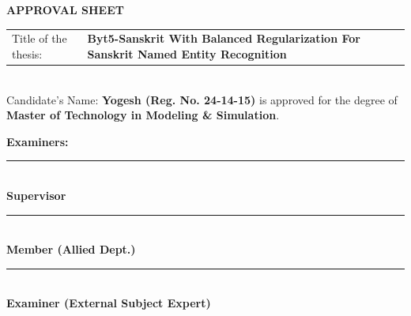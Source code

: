 \begin{center}
	{\Large \textbf{APPROVAL SHEET}}
\end{center}

\vspace{0.5em}
\vspace{1cm}
\noindent

\begin{tabular}{@{}p{4cm} p{10cm}@{}}
	{Title of the thesis:} & \setstretch{1.32}\textbf{Byt5-Sanskrit With Balanced Regularization For Sanskrit Named Entity Recognition}
\end{tabular}\\[.5em]
\indent Candidate's Name:    \textbf{Yogesh (Reg. No. 24-14-15)} is approved for the degree \indent of \textbf{Master of Technology in Modeling \& Simulation}.


%

\begin{center}
	\textbf{Examiners:}
\end{center}
\vspace{3.5em}
\vspace{1cm}
\noindent\hfill
\begin{minipage}[t]{9cm}
	\centering
	\rule{9cm}{0.4pt}\\[0.3em]
	\textbf{Supervisor}\\
\end{minipage}

\vspace{3.5em}
\vspace{1cm}
\noindent\hfill
\begin{minipage}[t]{9cm}
	\centering
	\rule{9cm}{0.4pt}\\[0.3em]
	\textbf{Member (Allied Dept.)}
\end{minipage}

\vspace{3.5em}
\vspace{1cm}
\noindent\hfill
\begin{minipage}[t]{9cm}
	\centering
	\rule{9cm}{0.4pt}\\[0.3em]
	\textbf{Examiner (External Subject Expert)}
\end{minipage}

